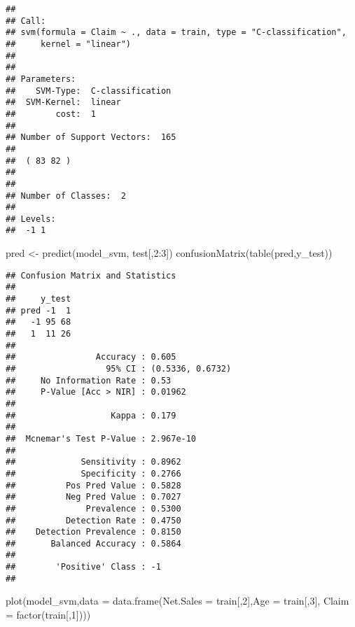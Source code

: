\documentclass[
]{article}
\newenvironment{Shaded}{\begin{snugshade}}{\end{snugshade}}
\newcommand{\AttributeTok}[1]{\textcolor[rgb]{0.77,0.63,0.00}{#1}}
\newcommand{\DecValTok}[1]{\textcolor[rgb]{0.00,0.00,0.81}{#1}}
\newcommand{\FunctionTok}[1]{\textcolor[rgb]{0.00,0.00,0.00}{#1}}
\newcommand{\NormalTok}[1]{#1}
\newcommand{\OtherTok}[1]{\textcolor[rgb]{0.56,0.35,0.01}{#1}}
\newcommand{\SpecialCharTok}[1]{\textcolor[rgb]{0.00,0.00,0.00}{#1}}
\begin{document}
\begin{verbatim}
## 
## Call:
## svm(formula = Claim ~ ., data = train, type = "C-classification", 
##     kernel = "linear")
## 
## 
## Parameters:
##    SVM-Type:  C-classification 
##  SVM-Kernel:  linear 
##        cost:  1 
## 
## Number of Support Vectors:  165
## 
##  ( 83 82 )
## 
## 
## Number of Classes:  2 
## 
## Levels: 
##  -1 1
\end{verbatim}

\begin{Shaded}
\begin{Highlighting}[]
\NormalTok{pred }\OtherTok{\textless{}{-}} \FunctionTok{predict}\NormalTok{(model\_svm, test[,}\DecValTok{2}\SpecialCharTok{:}\DecValTok{3}\NormalTok{])}
\FunctionTok{confusionMatrix}\NormalTok{(}\FunctionTok{table}\NormalTok{(pred,y\_test))}
\end{Highlighting}
\end{Shaded}

\begin{verbatim}
## Confusion Matrix and Statistics
## 
##     y_test
## pred -1  1
##   -1 95 68
##   1  11 26
##                                           
##                Accuracy : 0.605           
##                  95% CI : (0.5336, 0.6732)
##     No Information Rate : 0.53            
##     P-Value [Acc > NIR] : 0.01962         
##                                           
##                   Kappa : 0.179           
##                                           
##  Mcnemar's Test P-Value : 2.967e-10       
##                                           
##             Sensitivity : 0.8962          
##             Specificity : 0.2766          
##          Pos Pred Value : 0.5828          
##          Neg Pred Value : 0.7027          
##              Prevalence : 0.5300          
##          Detection Rate : 0.4750          
##    Detection Prevalence : 0.8150          
##       Balanced Accuracy : 0.5864          
##                                           
##        'Positive' Class : -1              
## 
\end{verbatim}

\begin{Shaded}
\begin{Highlighting}[]
\FunctionTok{plot}\NormalTok{(model\_svm,}\AttributeTok{data =} \FunctionTok{data.frame}\NormalTok{(}\AttributeTok{Net.Sales =}\NormalTok{ train[,}\DecValTok{2}\NormalTok{],}\AttributeTok{Age =}\NormalTok{ train[,}\DecValTok{3}\NormalTok{], }\AttributeTok{Claim =} \FunctionTok{factor}\NormalTok{(train[,}\DecValTok{1}\NormalTok{])))}
\end{Highlighting}
\end{Shaded}
\end{document}
